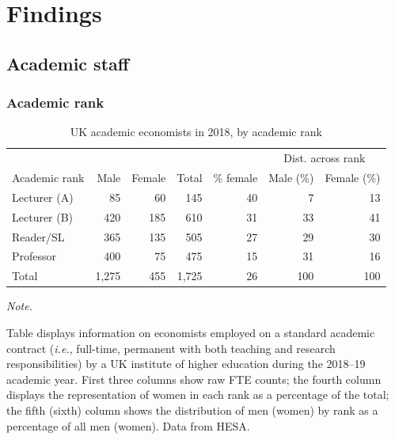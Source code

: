 \documentclass[a4paper, 1]{article}
\begin{document}
\hypertarget{sec:findings}{%
\section{Findings}\label{sec:findings}}

\hypertarget{sec:staff}{%
\subsection{Academic staff}\label{sec:staff}}

\hypertarget{sec:contract-level}{%
\subsubsection{Academic rank}\label{sec:contract-level}}



\begin{table}

\caption{\label{tab:contract}UK academic economists in 2018, by academic rank}
\centering
\begin{threeparttable}
\begin{tabular}[t]{lrrrrrr}
\toprule
\multicolumn{1}{c}{} & \multicolumn{4}{c}{ } & \multicolumn{2}{c}{Dist. across rank} \\
\cmidrule(l{3pt}r{3pt}){6-7}
Academic rank & Male & Female & Total & \% female & Male (\%) & Female (\%)\\
\midrule
Lecturer (A) & 85 & 60 & 145 & 40 & 7 & 13\\
Lecturer (B) & 420 & 185 & 610 & 31 & 33 & 41\\
Reader/SL & 365 & 135 & 505 & 27 & 29 & 30\\
Professor & 400 & 75 & 475 & 15 & 31 & 16\\
\midrule
Total & 1,275 & 455 & 1,725 & 26 & 100 & 100\\
\bottomrule
\end{tabular}
\begin{tablenotes}[para]
\item \textit{Note.}
\item Table displays information on economists employed on a standard academic contract (\emph{i.e.}, full-time, permanent with both teaching and research responsibilities) by a UK institute of higher education during the 2018--19 academic year. First three columns show raw FTE counts; the fourth column displays the representation of women in each rank as a percentage of the total; the fifth (sixth) column shows the distribution of men (women) by rank as a percentage of all men (women). Data from HESA.
\end{tablenotes}
\end{threeparttable}
\end{table}
\end{document}
